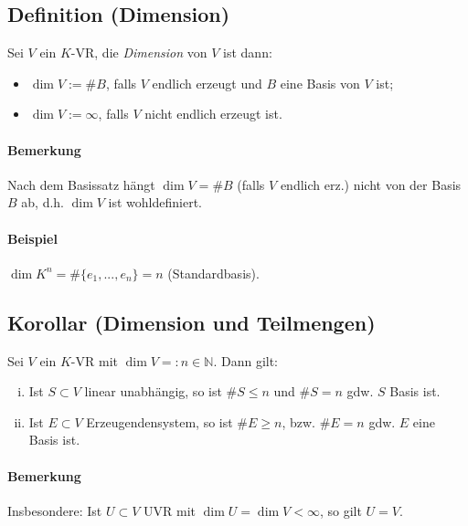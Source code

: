 \subsection{Definition (Dimension)}
    \begin{Definition}[Dimension]
    	Sei $V$ ein $K$-VR, die \emph{Dimension} von $ V $ ist dann:
        \begin{itemize}
            \item $\dim V:= \#B$, falls $ V $ endlich erzeugt und $B$ eine Basis von $V$ ist;
            \item $\dim V:= \infty$, falls $V$ nicht endlich erzeugt ist.
        \end{itemize}
    \end{Definition}
    
\paragraph{Bemerkung}
    Nach dem Basissatz hängt $\dim V = \#B$ (falls $V$ endlich erz.) nicht von der Basis $B$ ab, d.h. $\dim V$ ist wohldefiniert.
    
\paragraph{Beispiel}
    $\dim K^n = \#\{e_1,...,e_n\} = n$ (Standardbasis).

\subsection{Korollar (Dimension und Teilmengen)}
	\begin{Korollar}
		Sei $ V $ ein $ K $-VR mit $\dim V =: n\in \mathbb{N}$. Dann gilt:
    \begin{enumerate}[(i)]
    	\item Ist $S \subset V$ linear unabhängig, so ist $\# S \leq n$ und $\# S = n$ gdw. $ S $ Basis ist.
    	\item Ist $E \subset V$ Erzeugendensystem, so ist $\#E \geq n$, bzw. $\#E = n$ gdw. $ E $ eine Basis ist.
    \end{enumerate}
	\end{Korollar}
    
\paragraph{Bemerkung}
	Insbesondere: Ist $U\subset V$ UVR mit $\dim U=\dim V < \infty$, so gilt $ U=V $.
   
